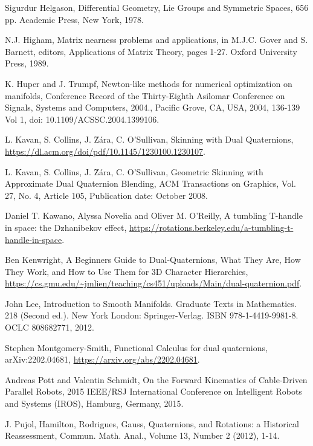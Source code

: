 \documentclass[reqno,12pt]{amsart}
\begin{document}
\begin{thebibliography}{99}
 Sigurdur Helgason, Differential Geometry, Lie Groups and Symmetric Spaces, 656 pp. Academic Press, New York, 1978.

 N.J. Higham, Matrix nearness problems and applications, in M.J.C. Gover and S. Barnett, editors, Applications of Matrix Theory, pages 1-27. Oxford University Press, 1989.

 K. Huper and J. Trumpf, Newton-like methods for numerical optimization on manifolds, Conference Record of the Thirty-Eighth Asilomar Conference on Signals, Systems and Computers, 2004., Pacific Grove, CA, USA, 2004, 136-139 Vol 1, doi: 10.1109/ACSSC.2004.1399106.

 L. Kavan, S. Collins, J. \u Z\'ara, C. O'Sullivan, Skinning with Dual Quaternions, \url{https://dl.acm.org/doi/pdf/10.1145/1230100.1230107}.

 L. Kavan, S. Collins, J. \u Z\'ara, C. O'Sullivan, Geometric Skinning with Approximate Dual Quaternion Blending, ACM Transactions on Graphics, Vol. 27, No. 4, Article 105, Publication date: October 2008.

 Daniel T. Kawano, Alyssa Novelia and Oliver M. O'Reilly, A tumbling T-handle in space: the Dzhanibekov effect, \url{https://rotations.berkeley.edu/a-tumbling-t-handle-in-space}.

 Ben Kenwright, A Beginners Guide to Dual-Quaternions, What They Are, How They Work, and How to Use Them for 3D Character Hierarchies, \url{https://cs.gmu.edu/~jmlien/teaching/cs451/uploads/Main/dual-quaternion.pdf}.

 John Lee, Introduction to Smooth Manifolds. Graduate Texts in Mathematics. 218 (Second ed.). New York London: Springer-Verlag. ISBN 978-1-4419-9981-8. OCLC 808682771, 2012.

 Stephen Montgomery-Smith, Functional Calculus for dual quaternions, arXiv:2202.04681, \url{https://arxiv.org/abs/2202.04681}.

 Andreas Pott and Valentin Schmidt, On the Forward Kinematics of Cable-Driven Parallel Robots, 2015 IEEE/RSJ International Conference on Intelligent Robots and Systems (IROS), Hamburg, Germany, 2015.

 J. Pujol, Hamilton, Rodrigues, Gauss, Quaternions, and Rotations: a Historical Reassessment, Commun. Math. Anal., Volume 13, Number 2 (2012), 1-14.


\end{thebibliography}
\end{document}
